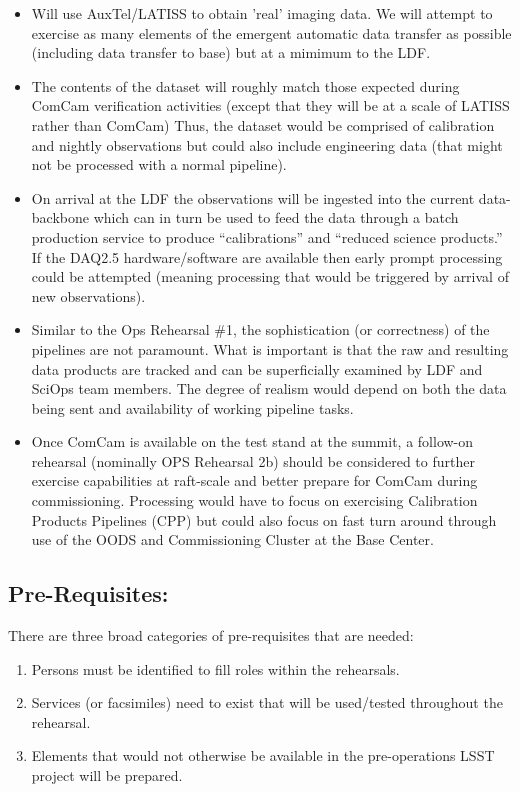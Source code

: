 \begin{itemize}[topsep=-8pt]
\item Will use AuxTel/LATISS to obtain 'real' imaging data.  We will attempt
to exercise as many elements of the emergent automatic data transfer as possible 
(including data transfer to base) but at a mimimum to the LDF.

\item The contents of the dataset will roughly match those expected during 
ComCam verification activities (except that they will be at a scale of LATISS
rather than ComCam) Thus, the dataset would be comprised of calibration and 
nightly observations but could also include engineering data (that might not 
be processed with a normal pipeline).

\item On arrival at the LDF the observations will be ingested into the current
data-backbone which can in turn be used to feed the data through a batch
production service to produce ``calibrations'' and ``reduced science products.''
If the DAQ2.5 hardware/software are available then early prompt processing could
be attempted (meaning processing that would be triggered by arrival of new observations).

\item Similar to the Ops Rehearsal \#1, the sophistication (or correctness)
of the pipelines are not paramount.  What is important is that the raw and
resulting data products are tracked and can be superficially examined by LDF and
SciOps team members.  The degree of realism would depend on both the data
being sent and availability of working pipeline tasks.

\item Once ComCam is available on the test stand at the summit, a follow-on 
rehearsal (nominally OPS Rehearsal 2b) should be considered to further exercise
capabilities at raft-scale and better prepare for ComCam during commissioning.
Processing would have to focus on exercising Calibration Products Pipelines (CPP) 
but could also focus on fast turn around through use of the OODS and Commissioning
Cluster at the Base Center.
\end{itemize}

\clearpage

\subsection{Pre-Requisites:}

There are three broad categories of pre-requisites that are needed:
\begin{enumerate}[topsep=-8pt]
\item Persons must be identified to fill roles within the rehearsals.
\item Services (or facsimiles) need to exist that will be used/tested throughout the 
rehearsal.
\item Elements that would not otherwise 
be available in the pre-operations LSST project will be prepared.
\end{enumerate}
 
